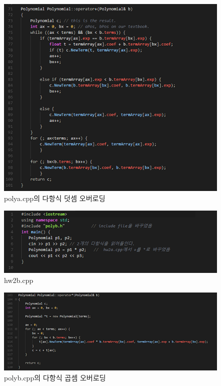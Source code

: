 \documentclass[a4paper,12pt]{article}
\begin{document}
\begin{figure}[t]\vspace*{4pt} 
\centerline{\includegraphics[width=1.0\columnwidth]{polya3}} 
\caption{polya.cpp의 다항식 덧셈 오버로딩}\vspace*{-6pt} 
\label{figure:polya3} 
\end{figure} 


\begin{figure}[t]\vspace*{4pt} 
\centerline{\includegraphics[width=1.0\columnwidth]{hw2b}} 
\caption{hw2b.cpp}\vspace*{-6pt} 
\label{figure:rawdata} 
\end{figure} 

\begin{figure}[t]\vspace*{4pt} 
\centerline{\includegraphics[width=1.0\columnwidth]{polyb}} 
\caption{polyb.cpp의 다항식 곱셈 오버로딩}\vspace*{-6pt} 
\label{figure:rawdata} 
\end{figure} 
\end{document}
